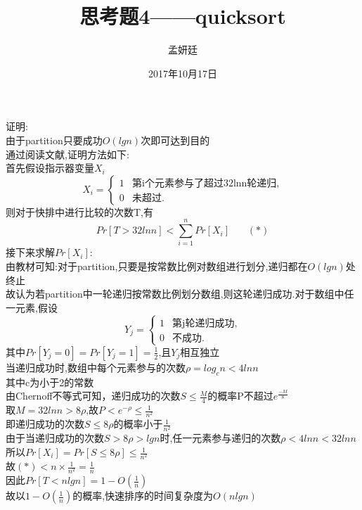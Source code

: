 \documentclass[19pt,a4paper]{article}
\title{思考题4——quicksort}
\author{孟妍廷\quad 2015202009}
\date{2017年10月17日}
\begin{document}
\maketitle
证明:\\
\indent 由于partition只要成功$O(lgn)$次即可达到目的\\
\indent 通过阅读文献,证明方法如下:\\
\indent 首先假设指示器变量$X_i$
$$X_i=\begin{cases}
1&\text{第i个元素参与了超过32lnn轮递归},\\
0&\text{未超过}.
\end{cases}$$
\indent 则对于快排中进行比较的次数T,有
$$Pr[T>32lnn]<\sum_{i=1}^{n}Pr[X_i]\ \ \ \ \ \ \ \ (*)$$
\indent 接下来求解$Pr[X_i]$:\\
\indent 由教材可知:对于partition,只要是按常数比例对数组进行划分,递归都在$O(lgn)$处终止\\
\indent 故认为若partition中一轮递归按常数比例划分数组,则这轮递归成功.对于数组中任一元素,假设
$$Y_j=\begin{cases}
1&\text{第j轮递归成功},\\
0&\text{不成功}.
\end{cases}$$
\indent 其中$Pr[Y_j=0]=Pr[Y_j=1]=\frac{1}{2}$,且$Y_j$相互独立\\
\indent 当递归成功时,数组中每个元素参与的次数$\rho=log_cn<4lnn$\\
\indent 其中c为小于2的常数\\
\indent 由Chernoff不等式可知，递归成功的次数$S\le\frac{M}{4}$的概率P不超过$e^\frac{-M}{8}$\\
\indent 取$M=32lnn>8\rho$,故$P<e^{-\rho}\le \frac{1}{n^2}$\\
\indent 即递归成功的次数$S\le8\rho$的概率小于$\frac{1}{n^2}$\\
\indent  由于当递归成功的次数$S>8\rho>lgn$时,任一元素参与递归的次数$\rho<4lnn<32lnn$\\
\indent  所以$Pr[X_i]=Pr[S\le8\rho]\le\frac{1}{n^2}$\\
\indent 故$(*)<n\times \frac{1}{n^2}=\frac{1}{n}$\\
\indent 因此$Pr[T<nlgn]=1-O(\frac{1}{n})$\\
\indent 故以$1-O(\frac{1}{n})$的概率,快速排序的时间复杂度为$O(nlgn)$
\end{document}
